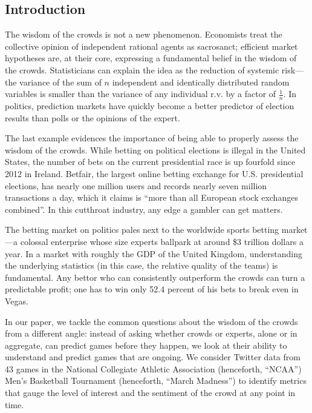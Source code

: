 \documentclass[12pt]{article}
\begin{document}
\newpage

\tableofcontents
\newpage
\begin{doublespacing}

\section{Introduction}

The wisdom of the crowds is not a new phenomenon. Economists treat the collective opinion of independent rational agents as sacrosanct; efficient market hypotheses are, at their core, expressing a fundamental belief in the wisdom of the crowds. Statisticians can explain the idea as the reduction of systemic risk---the variance of the sum of $n$ independent and identically distributed random variables is smaller than the variance of any individual r.v. by a factor of $\frac{1}{n}$. In politics, prediction markets have quickly become a better predictor of election results than polls or the opinions of the expert.

The last example evidences the importance of being able to properly assess the wisdom of the crowds. While betting on political elections is illegal in the United States, the number of bets on the current presidential race is up fourfold since 2012 in Ireland. Betfair, the largest online betting exchange for U.S. presidential elections, has nearly one million users and records nearly seven million transactions a day, which it claims is ``more than all European stock exchanges combined''. In this cutthroat industry, any edge a gambler can get matters. 

The betting market on politics pales next to the worldwide sports betting market---a colossal enterprise whose size experts ballpark at around \$3 trillion dollars a year. In a market with roughly the GDP of the United Kingdom, understanding the underlying statistics (in this case, the relative quality of the teams) is fundamental. Any bettor who can consistently outperform the crowds can turn a predictable profit; one has to win only 52.4 percent of his bets to break even in Vegas. 

In our paper, we tackle the common questions about the wisdom of the crowds from a different angle: instead of asking whether crowds or experts, alone or in aggregate, can predict games before they happen, we look at their ability to understand and predict games that are ongoing. We consider Twitter data from 43 games in the National Collegiate Athletic Association (henceforth, ``NCAA'') Men's Basketball Tournament (henceforth, ``March Madness'') to identify metrics that gauge the level of interest and the sentiment of the crowd at any point in time. 


\end{doublespacing}
\end{document}
